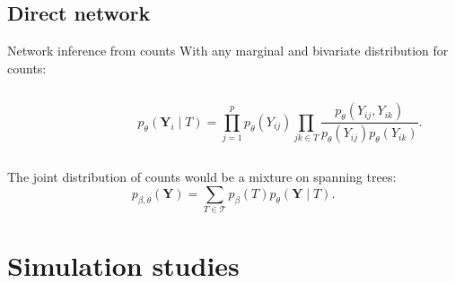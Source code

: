 \documentclass[11pt]{beamer}
\newcommand{\Ybf}{{\boldsymbol{Y}}}
\newcommand{\length}{1.5}
\newcommand{\emphase}[1]{\textcolor{Complement}{#1}}
\begin{document}
 \subsection{Direct network}
 \begin{frame}{Network inference from counts}
  With \emphase{any marginal and bivariate distribution for counts}:\\
\begin{columns}
 \begin{column}{0.1\linewidth}
  \begin{flushright}
   \end{flushright}
   \end{column}
    \begin{column}{0.9\linewidth}
 $$p_\theta(\Ybf_i \mid T) = \prod_{j=1}^p p_\theta(Y_{ij}) \prod_{jk\in T} \frac{p_\theta(Y_{ij},Y_{ik})}{p_\theta(Y_{ij})p_\theta(Y_{ik})}.$$
  \end{column}
  \end{columns}
  \vspace{0.5cm}
  
The joint distribution of counts would be a mixture on spanning trees:
$$p_{\beta, \theta}(\Ybf ) = \sum_{T\in \mathcal{T}} p_\beta(T)p_\theta(\Ybf\mid T).$$

 \end{frame}
 \section{Simulation studies}
\end{document}
